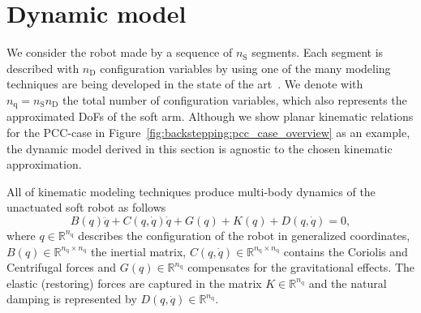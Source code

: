 \section{Dynamic model}\label{sec:backstepping:dynamic_model}

We consider the robot made by a sequence of $n_{\mathrm{S}}$ segments. Each segment is described with $n_{\mathrm{D}}$ configuration variables by using one of the many modeling techniques are being developed in the state of the art~\cite{faure2012sofa, grazioso2018geometrically, sadati2019TMTDyn, boyer2020dynamics}.
%
We denote with $n_{\mathrm{q}} = n_{\mathrm{S}} n_{\mathrm{D}}$ the total number of configuration variables, which also represents the approximated DoFs of the soft arm.
%
Although we show planar kinematic relations for the \gls{PCC}-case in Figure~\ref{fig:backstepping:pcc_case_overview} as an example, the dynamic model derived in this section is agnostic to the chosen kinematic approximation.
%

All of kinematic modeling techniques produce multi\--body dynamics of the unactuated soft robot as follows~\cite{della2023model}
%
\begin{equation}
	B(q)\ddot{q} + C(q,\dot{q}) \dot{q} + G(q) + K(q) + D(q, \dot{q}) = 0,
\end{equation}
%
where $q \in \mathbb{R}^{n_{\mathrm{q}}}$ describes the configuration of the robot in generalized coordinates, $B(q) \in \mathbb{R}^{n_{\mathrm{q}} \times n_{\mathrm{q}}}$ the inertial matrix, $C(q,\dot{q}) \in \mathbb{R}^{n_{\mathrm{q}} \times n_{\mathrm{q}}}$ contains the Coriolis and Centrifugal forces and $G(q) \in \mathbb{R}^{n_{\mathrm{q}}}$ compensates for the gravitational effects. The elastic (restoring) forces are captured in the matrix $K \in \mathbb{R}^{n_{\mathrm{q}}}$ and the natural damping is represented by $D(q,\dot{q}) \in \mathbb{R}^{n_{\mathrm{q}}}$.

